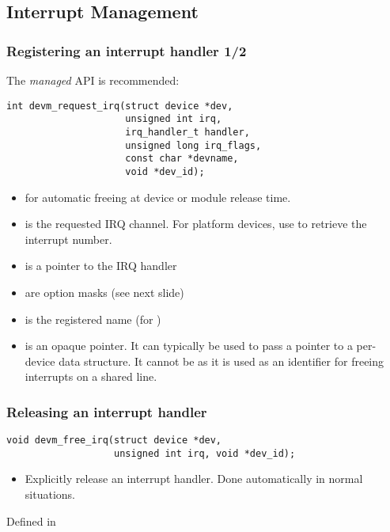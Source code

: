 \subsection{Interrupt Management}

\begin{frame}[fragile]
  \frametitle{Registering an interrupt handler 1/2}
  The {\em managed} API is recommended:
  \begin{verbatim}
int devm_request_irq(struct device *dev,
                     unsigned int irq,
                     irq_handler_t handler,
                     unsigned long irq_flags,
                     const char *devname,
                     void *dev_id);
  \end{verbatim}
  \begin{itemize}
  \item {} for automatic freeing at device or module
        release time.
  \item {} is the requested IRQ channel. For platform
        devices, use  to retrieve the
        interrupt number.
  \item {} is a pointer to the IRQ handler
  \item {} are option masks (see next slide)
  \item {} is the registered name (for
	)
  \item {} is an opaque pointer. It can typically
        be used to pass a pointer to a per-device data structure.
        It cannot be  as it is used as an identifier for
        freeing interrupts on a shared line.
  \end{itemize}
\end{frame}

\begin{frame}[fragile]
  \frametitle{Releasing an interrupt handler}
  \begin{verbatim}
void devm_free_irq(struct device *dev,
                   unsigned int irq, void *dev_id);
  \end{verbatim}
  \begin{itemize}
  \item Explicitly release an interrupt handler. Done automatically
        in normal situations.
  \end{itemize}
  Defined in 
\end{frame}


